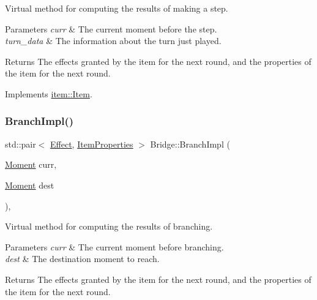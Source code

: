 Virtual method for computing the results of making a step. 


\begin{DoxyParams}{Parameters}
{\em curr} & The current moment before the step. \\
\hline
{\em turn\+\_\+data} & The information about the turn just played. \\
\hline
\end{DoxyParams}
\begin{DoxyReturn}{Returns}
The effects granted by the item for the next round, and the properties of the item for the next round. 
\end{DoxyReturn}


Implements \hyperlink{classitem_1_1_item_a90df61c8a2a20144eb1100af5fb2d464}{item\+::\+Item}.

\mbox{\label{classitem_1_1_bridge_a175b2a911174c682ea163bc248836a87}} 
\subsubsection{\texorpdfstring{Branch\+Impl()}{BranchImpl()}}
{\footnotesize\ttfamily std\+::pair$<$ \hyperlink{classitem_1_1_effect}{Effect}, \hyperlink{classitem_1_1_item_properties}{Item\+Properties} $>$ Bridge\+::\+Branch\+Impl (\begin{DoxyParamCaption}\item[{\hyperlink{classtimeplane_1_1_moment}{Moment}}]{curr,  }\item[{\hyperlink{classtimeplane_1_1_moment}{Moment}}]{dest }\end{DoxyParamCaption})\hspace{0.3cm}{\ttfamily [protected]}, {\ttfamily [virtual]}}



Virtual method for computing the results of branching. 


\begin{DoxyParams}{Parameters}
{\em curr} & The current moment before branching. \\
\hline
{\em dest} & The destination moment to reach. \\
\hline
\end{DoxyParams}
\begin{DoxyReturn}{Returns}
The effects granted by the item for the next round, and the properties of the item for the next round. 
\end{DoxyReturn}


